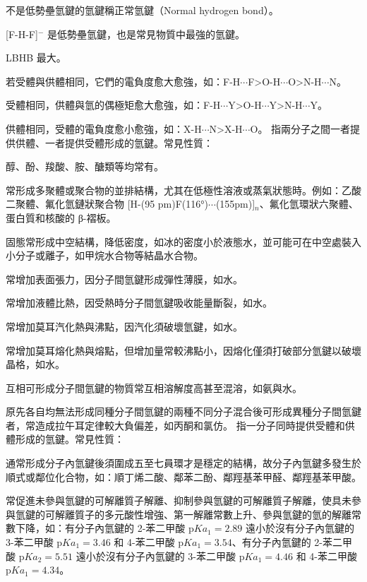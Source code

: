 \documentclass[a4paper,12pt]{report}
\begin{document}
不是低勢壘氫鍵的氫鍵稱正常氫鍵（Normal hydrogen bond）。

[F-H-F]$^-$ 是低勢壘氫鍵，也是常見物質中最強的氫鍵。
\ben
\item LBHB 最大。
\item 若受體與供體相同，它們的電負度愈大愈強，如：F-H$\cdots$F>O-H$\cdots$O>N-H$\cdots$N。
\item 受體相同，供體與氫的偶極矩愈大愈強，如：F-H$\cdots$Y>O-H$\cdots$Y>N-H$\cdots$Y。
\item 供體相同，受體的電負度愈小愈強，如：X-H$\cdots$N>X-H$\cdots$O。
\een
{}
指兩分子之間一者提供供體、一者提供受體形成的氫鍵。常見性質：
\bit
\item 醇、酚、羧酸、胺、醣類等均常有。
\item 常形成多聚體或聚合物的並排結構，尤其在低極性溶液或蒸氣狀態時。例如：乙酸二聚體、氟化氫鏈狀聚合物 [H-(95 pm)F(116°)$\cdots$(155pm)]$_n$、氟化氫環狀六聚體、蛋白質和核酸的 β-褶板。
\item 固態常形成中空結構，降低密度，如冰的密度小於液態水，並可能可在中空處裝入小分子或離子，如甲烷水合物等結晶水合物。
\item 常增加表面張力，因分子間氫鍵形成彈性薄膜，如水。
\item 常增加液體比熱，因受熱時分子間氫鍵吸收能量斷裂，如水。
\item 常增加莫耳汽化熱與沸點，因汽化須破壞氫鍵，如水。
\item 常增加莫耳熔化熱與熔點，但增加量常較沸點小，因熔化僅須打破部分氫鍵以破壞晶格，如水。
\item 互相可形成分子間氫鍵的物質常互相溶解度高甚至混溶，如氨與水。
\item 原先各自均無法形成同種分子間氫鍵的兩種不同分子混合後可形成異種分子間氫鍵者，常造成拉午耳定律較大負偏差，如丙酮和氯仿。
\eit
{}
指一分子同時提供受體和供體形成的氫鍵。常見性質：
\bit
\item 通常形成分子內氫鍵後須圍成五至七員環才是穩定的結構，故分子內氫鍵多發生於順式或鄰位化合物，如：順丁烯二酸、鄰苯二酚、鄰羥基苯甲醛、鄰羥基苯甲酸。
\item 常促進未參與氫鍵的可解離質子解離、抑制參與氫鍵的可解離質子解離，使具未參與氫鍵的可解離質子的多元酸性增強、第一解離常數上升、參與氫鍵的氫的解離常數下降，如：有分子內氫鍵的 2-苯二甲酸 p$Ka_1=2.89$ 遠小於沒有分子內氫鍵的 3-苯二甲酸 p$Ka_1=3.46$ 和 4-苯二甲酸 p$Ka_1=3.54$、有分子內氫鍵的 2-苯二甲酸 p$Ka_2=5.51$ 遠小於沒有分子內氫鍵的 3-苯二甲酸 p$Ka_1=4.46$ 和 4-苯二甲酸 p$Ka_1=4.34$。
\end{document}
